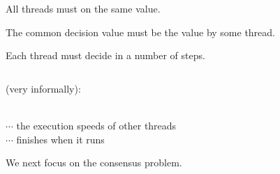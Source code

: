 
\begin{frame}{}
  \centerline{}

  \vspace{0.50cm}
\end{frame}

\begin{frame}{}
  \centerline{\large {}}

  \pause
  \begin{definition}
    \begin{description}
      \setlength{\itemsep}{5pt}
      \item[Consistent] All  threads must  on the same value.
      \item[Valid] The common decision value must be the value  by some thread.
      \item[Wait-free] Each  thread must decide in a  number of steps.
    \end{description}
  \end{definition}
\end{frame}

\begin{frame}{}
  \begin{columns}
      \begin{columns}
      \end{columns}
  \end{columns}

  \vspace{0.40cm}
  \begin{center}
     {\footnotesize (very informally)}: \\
     \\[8pt] \pause

    $\cdots$  the execution speeds of other threads \pause \\[6pt]
    $\cdots$  finishes when it runs 
  \end{center}
\end{frame}

\begin{frame}{}
  
  \vspace{0.30cm}
  \begin{center}
    {\Large We next focus on the  consensus problem.} \\[6pt] \pause
  \end{center}
\end{frame}
